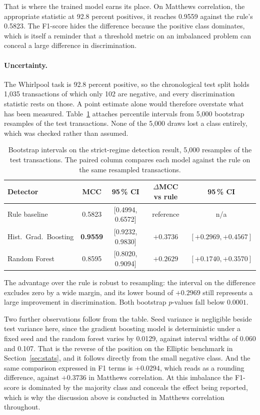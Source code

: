 \documentclass[12pt,a4paper]{article}
\begin{document}
That is where the trained model earns its place. On Matthews
correlation, the appropriate statistic at 92.8 percent positives,
it reaches 0.9559 against the rule's 0.5823. The F1-score hides
the difference because the positive class dominates, which is
itself a reminder that a threshold metric on an imbalanced
problem can conceal a large difference in discrimination.

\paragraph{Uncertainty.}
The Whirlpool task is 92.8 percent positive, so the chronological
test split holds 1{,}035 transactions of which only 102 are
negative, and every discrimination statistic rests on those. A
point estimate alone would therefore overstate what has been
measured. Table~\ref{tab:detection_ci} attaches percentile
intervals from 5{,}000 bootstrap resamples of the test
transactions. None of the 5{,}000 draws lost a class entirely,
which was checked rather than assumed.

\begin{table}[htbp]
\centering
\small
\caption{Bootstrap intervals on the strict-regime detection
result, 5{,}000 resamples of the test transactions. The paired
column compares each model against the rule on the same
resampled transactions.}
\label{tab:detection_ci}
\begin{tabular}{lcccc}
\toprule
Detector & MCC & 95\,\% CI & $\Delta$MCC vs rule & 95\,\% CI \\
\midrule
Rule baseline          & 0.5823 & [0.4994, 0.6572] & reference & n/a \\
Hist.\ Grad.\ Boosting & \textbf{0.9559} & [0.9232, 0.9830] & $+0.3736$ & $[+0.2969, +0.4567]$ \\
Random Forest          & 0.8595 & [0.8020, 0.9094] & $+0.2629$ & $[+0.1740, +0.3570]$ \\
\bottomrule
\end{tabular}
\end{table}

The advantage over the rule is robust to resampling: the interval
on the difference excludes zero by a wide margin, and its lower
bound of $+0.2969$ still represents a large improvement in
discrimination. Both bootstrap $p$-values fall below $0.0001$.

Two further observations follow from the table. Seed variance is
negligible beside test variance here, since the gradient boosting
model is deterministic under a fixed seed and the random forest
varies by 0.0129, against interval widths of 0.060 and 0.107.
That is the reverse of the position on the Elliptic benchmark in
Section~\ref{sec:stats}, and it follows directly from the small
negative class. And the same comparison expressed in F1 terms is
$+0.0294$, which reads as a rounding difference, against
$+0.3736$ in Matthews correlation. At this imbalance the
F1-score is dominated by the majority class and conceals the
effect being reported, which is why the discussion above is
conducted in Matthews correlation throughout.
\end{document}
